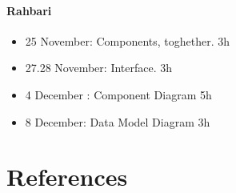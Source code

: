 \documentclass{article}
\begin{document}
	\paragraph{Rahbari}
		\begin{itemize}
			\item 25 November: Components, toghether. 3h
			\item 27.28 November: Interface. 3h
			\item 4 December : Component Diagram 5h
			\item 8 December: Data Model Diagram 3h
		\end{itemize}
\section{References}
\end{document}
